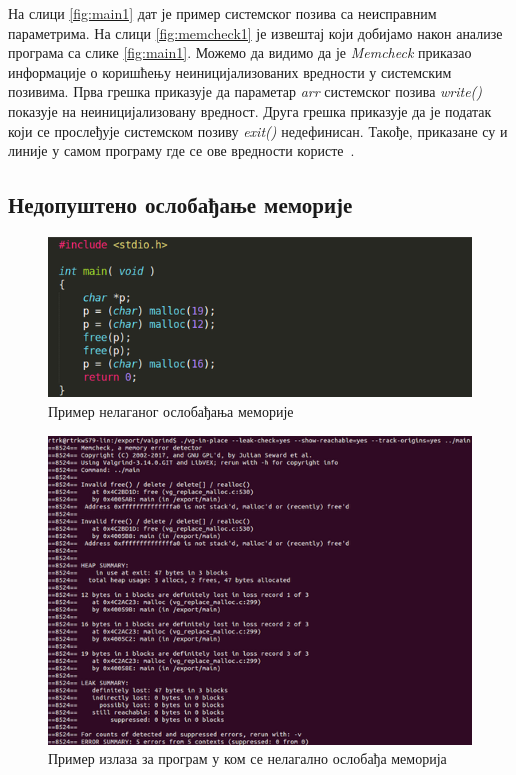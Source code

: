 \documentclass[12pt,oneside]{memoir}
\begin{document}
\indent На слици \ref{fig:main1} дат је пример системског позива са неисправним параметрима. На слици \ref{fig:memcheck1} је извештај који добијамо након анализе програма са слике \ref{fig:main1}. Можемо да видимо да је \textit{Memcheck} приказао информације о коришћењу неиницијализованих вредности у системским позивима. Прва грешка приказује да параметар \textit{arr} системског позива \textit{write()} показује на неиницијализовану вредност. Друга грешка приказује да је податак који се прослеђује системском позиву \textit{exit()} недефинисан. Такође, приказане су и линије у самом програму где се ове вредности користе~\cite{memcheckRef}.

\subsection{Недопуштено ослобађање меморије}

\begin{figure}[h!]
\begin{center}
\includegraphics[scale=0.75]{slika5.png}
\end{center}
\caption{Пример нелаганог ослобађања меморије}
\label{fig:main2}
\end{figure}

\begin{figure}[h!]
\begin{center}
\includegraphics[scale=0.75]{slika6.png}
\end{center}
\caption{Пример излаза за програм у ком се нелагално ослобађа меморија}
\label{fig:memcheck2}
\end{figure}
\end{document}
